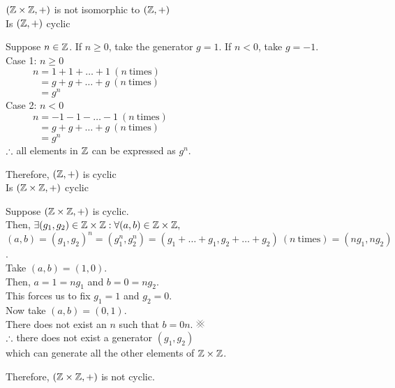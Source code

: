 \documentclass[a4paper, 11pt]{report}
\begin{document}
\Claim $(\mathbb{Z}\times\mathbb{Z},+)$ is not isomorphic to $(\mathbb{Z},+)$ 
\proof ${}^{}$\\
Is $(\mathbb{Z},+)$ cyclic
\begin{list}{}{\setlength{\leftmargin}{0.5in}\setlength{\topsep}{0pt}}\item
  Suppose $n\in\mathbb{Z}$. If $n\geq0$, take the generator $g=1$. If $n<0$, take $g=-1$. \\
  Case 1: $n\geq0$ \\
  $\phantom{\sum}\phantom{\sum}n = 1 + 1 + \dots + 1\ (n\ \text{times})$ \\
  $\phantom{\sum}\phantom{\sum}\phantom{n} = g + g + \dots + g\ (n\ \text{times})$ \\
  $\phantom{\sum}\phantom{\sum}\phantom{n} = g^n$ \\
  Case 2: $n<0$ \\
  $\phantom{\sum}\phantom{\sum}n = -1 - 1 - \dots - 1\ (n\ \text{times})$ \\
  $\phantom{\sum}\phantom{\sum}\phantom{n} = g + g + \dots + g\ (n\ \text{times})$ \\
  $\phantom{\sum}\phantom{\sum}\phantom{n} = g^n$ \\
  $\therefore$ all elements in $\mathbb{Z}$ can be expressed as $g^n$.
\end{list}
Therefore, $(\mathbb{Z},+)$ is cyclic \\

Is $(\mathbb{Z}\times\mathbb{Z},+)$ cyclic
\begin{list}{}{\setlength{\leftmargin}{0.5in}\setlength{\topsep}{0pt}}\item
  Suppose $(\mathbb{Z}\times\mathbb{Z},+)$ is cyclic. \\
  Then, $\exists(g_1,g_2)\in\mathbb{Z}\times\mathbb{Z}:\forall (a,b)\in\mathbb{Z}\times\mathbb{Z},$\\
  $(a,b)=(g_1,g_2)^n=(g_1^n, g_2^n)=(g_1+\dots+g_1, g_2+\dots+g_2)\ (n\ \text{times})=(ng_1, ng_2)$. \\
  Take $(a,b)=(1,0)$. \\
  Then, $a=1=ng_1$ and $b=0=ng_2$. \\
  This forces us to fix $g_1=1$ and $g_2=0$. \\
  Now take $(a,b)=(0,1)$. \\
  There does not exist an $n$ such that $b=0n$. $\CONTRA$ \\
  $\therefore$ there does not exist a generator $(g_1,g_2)$\\
  which can generate all the other elements of $\mathbb{Z}\times\mathbb{Z}$.
\end{list}
Therefore, $(\mathbb{Z}\times\mathbb{Z},+)$ is not cyclic. \\
\end{document}
